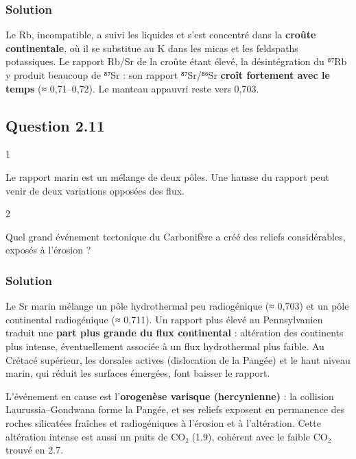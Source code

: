 \documentclass[11pt,a4paper]{article}
\begin{document}
\hypertarget{solution-20}{%
\subsubsection{Solution}\label{solution-20}}

Le Rb, incompatible, a suivi les liquides et s'est concentré dans la \textbf{croûte continentale}, où il se substitue au K dans les micas et les feldspaths potassiques. Le rapport Rb/Sr de la croûte étant élevé, la désintégration du ⁸⁷Rb y produit beaucoup de ⁸⁷Sr : son rapport ⁸⁷Sr/⁸⁶Sr \textbf{croît fortement avec le temps} (≈ 0,71--0,72). Le manteau appauvri reste vers 0,703.

\hypertarget{question-2.11}{%
\subsection{Question 2.11}\label{question-2.11}}

\begin{indication}{1}

Le rapport marin est un mélange de deux pôles. Une hausse du rapport peut venir de deux variations opposées des flux.

\end{indication}

\begin{indication}{2}

Quel grand événement tectonique du Carbonifère a créé des reliefs considérables, exposés à l'érosion ?

\end{indication}

\hypertarget{solution-21}{%
\subsubsection{Solution}\label{solution-21}}

Le Sr marin mélange un pôle hydrothermal peu radiogénique (≈ 0,703) et un pôle continental radiogénique (≈ 0,711). Un rapport plus élevé au Pennsylvanien traduit une \textbf{part plus grande du flux continental} : altération des continents plus intense, éventuellement associée à un flux hydrothermal plus faible. Au Crétacé supérieur, les dorsales actives (dislocation de la Pangée) et le haut niveau marin, qui réduit les surfaces émergées, font baisser le rapport.

L'événement en cause est l'\textbf{orogenèse varisque (hercynienne)} : la collision Laurussia--Gondwana forme la Pangée, et ses reliefs exposent en permanence des roches silicatées fraîches et radiogéniques à l'érosion et à l'altération. Cette altération intense est aussi un puits de CO₂ (1.9), cohérent avec le faible CO₂ trouvé en 2.7.
\end{document}

